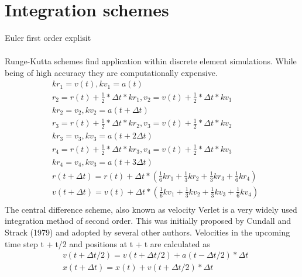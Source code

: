 \section*{Integration schemes}
Euler first order explisit
\begin{align}\label{eqn:euler}
\end{align}
\par
Runge-Kutta schemes find application within discrete element simulations. While being of high
accuracy they are computationally expensive.
\begin{equation}\label{eqn:rk4}
    \begin{split}
        &kr_1 = v(t), kv_1 = a(t)\\
        &r_2 = r(t) + \frac{1}{2} * \Delta t * kr_1, v_2 = v(t) + \frac{1}{2} * \Delta t * kv_1\\
        &kr_2 = v_2, kv_2 = a(t + \Delta t)\\
        &r_3 = r(t) + \frac{1}{2} * \Delta t * kr_2, v_3 = v(t) + \frac{1}{2} * \Delta t * kv_2\\
        &kr_3 = v_3, kv_3 = a(t + 2\Delta t)\\
        &r_4 = r(t) + \frac{1}{2} * \Delta t * kr_3, v_4 = v(t) + \frac{1}{2} * \Delta t * kv_3\\
        &kr_4 = v_4, kv_3 = a(t + 3\Delta t)\\
        &r(t+\Delta t) = r(t) + \Delta t * (\frac{1}{6} kr_1 + \frac{1}{3} kr_2 + \frac{1}{3} kr_3 + \frac{1}{6} kr_4)\\
        &v(t+\Delta t) = v(t) + \Delta t * (\frac{1}{6} kv_1 + \frac{1}{3} kv_2 + \frac{1}{3} kv_3 + \frac{1}{6} kv_4)\\
    \end{split}
\end{equation}
The central difference scheme, also known as velocity Verlet is a very widely used integration
method of second order. This was initially proposed by Cundall and Strack (1979) and adopted by
several other authors. Velocities in the upcoming time step t +t/2 and positions at t +t are
calculated as
\begin{equation}\label{eqn:verlet}
    \begin{split}
        &v(t + \Delta t/2) = v(t + \Delta t/2) +a(t - \Delta t/2) * \Delta t\\
        &x(t + \Delta t) = x(t) +v(t + \Delta t/2) * \Delta t\\
    \end{split}
\end{equation}

